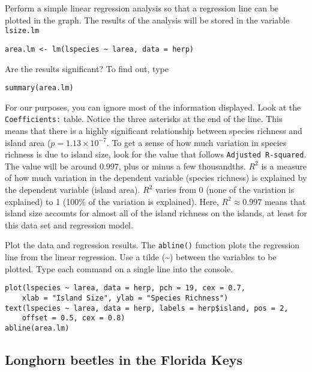 \documentclass[11pt]{article}
\begin{document}
Perform a simple linear regression analysis so that a regression line can be plotted in the graph. The results of the analysis will be stored in the variable \texttt{lsize.lm}

\begin{verbatim}
area.lm <- lm(lspecies ~ larea, data = herp)
\end{verbatim}

Are the results significant?  To find out, type

\begin{verbatim}
summary(area.lm)
\end{verbatim}

For our purposes, you can ignore most of the information displayed.  Look at the \texttt{Coefficients:} table. Notice the three asterisks at the end of the line.  This means that there is a highly significant relationship between species richness and island area ($p = 1.13 \times 10^{-7}$.  To get a sense of how much variation in species richness is due to island size, look for the value that follows \texttt{Adjusted R-squared}. The value will be around $0.997$, plus or minus a few thousandths.  $R^2$ is a measure of how much variation in the dependent variable (species richness) is explained by the dependent variable (island area). $R^2$ varies from 0 (none of the variation is explained) to 1 (100\% of the variation is explained). Here, $R^2 \approx 0.997$ means that island size accounts for almost all of the island richness on the islands, at least for this data set and regression model.

%

\newpage

Plot the data and regression results.  The \texttt{abline()} function plots the regression line from the linear regression.  Use a tilde (\textasciitilde) between the variables to be plotted. Type each command on a single line into the console.

\begin{verbatim}
plot(lspecies ~ larea, data = herp, pch = 19, cex = 0.7,  
    xlab = "Island Size", ylab = "Species Richness")
text(lspecies ~ larea, data = herp, labels = herp$island, pos = 2,
    offset = 0.5, cex = 0.8)
abline(area.lm)
\end{verbatim}

\subsection*{Longhorn beetles in the Florida Keys}
\end{document}
